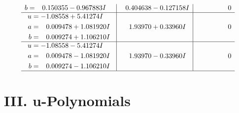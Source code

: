 \documentclass[1p]{elsarticle_modified}
\theoremstyle{definition}
\begin{document}
$$\begin{array}{c|c|c}
\begin{aligned}
b &= \phantom{-}0.150355 - 0.967883 I\end{aligned}
 & \phantom{-}0.404638 - 0.127158 I & \phantom{-0.000000 } 0 \\ \hline\begin{aligned}
u &= -1.08558 + 5.41274 I \\
a &= \phantom{-}0.009478 + 1.081920 I \\
b &= \phantom{-}0.009274 + 1.106210 I\end{aligned}
 & \phantom{-}1.93970 + 0.33960 I & \phantom{-0.000000 } 0 \\ \hline\begin{aligned}
u &= -1.08558 - 5.41274 I \\
a &= \phantom{-}0.009478 - 1.081920 I \\
b &= \phantom{-}0.009274 - 1.106210 I\end{aligned}
 & \phantom{-}1.93970 - 0.33960 I & \phantom{-0.000000 } 0\\
 \hline 
 \end{array}$$\newpage
\newpage\renewcommand{\arraystretch}{1}
\centering \section*{ III. u-Polynomials}
\end{document}
